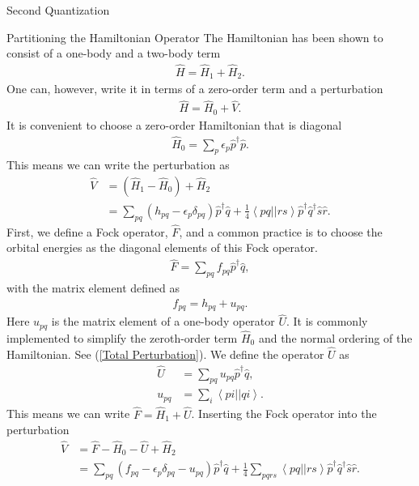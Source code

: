 \documentclass[twoside,english]{uiofysmaster}
\begin{document}
\begin{chapter}{Second Quantization}
	\begin{section}{Partitioning the Hamiltonian Operator}
		The Hamiltonian has been shown to consist of a one-body and a two-body term
		\begin{align}
			\hat H = \hat H_1 + \hat H_2.
		\end{align}
		One can, however, write it in terms of a zero-order term and a perturbation
		\begin{align}
			\hat H = \hat H_0 + \hat V.
		\end{align}
		It is convenient to choose a zero-order Hamiltonian that is diagonal
		\begin{align}
			\hat H_0 = \sum_p \epsilon_p \hat p^\dagger \hat p.
		\end{align}
		This means we can write the perturbation as
		\begin{align}
			\hat V &= (\hat H_1 - \hat H_0) + \hat H_2 \\
			&= \sum_{pq}(h_{pq} - \epsilon_p \delta_{pq} ) \hat p^\dagger \hat q + \frac{1}{4}\left<pq||rs\right>\hat p^\dagger \hat q^\dagger \hat s \hat r .
		\end{align}
		First, we define a Fock operator, $\hat F$, and a common practice is to choose the orbital energies as the diagonal elements of this Fock operator. 
		\begin{align}
			\hat F = \sum_{pq} f_{pq} \hat p^\dagger \hat q,
		\end{align}
		with the matrix element defined as
		\begin{align}
			f_{pq} = h_{pq} + u_{pq}.
		\end{align}
		Here $u_{pq}$ is the matrix element of a one-body operator $\hat U$. It is commonly implemented to simplify the zeroth-order term $\hat H_0$ and the normal ordering of the Hamiltonian. See (\ref{Total Perturbation}). We define the operator $\hat U$ as
		\begin{align}
			\hat U &= \sum_{pq} u_{pq} \hat p^\dagger \hat q, \\
			u_{pq} &= \sum_i \left<pi||qi\right>.
		\end{align}
		This means we can write $\hat F = \hat H_1 + \hat U$. Inserting the Fock operator into the perturbation
		\begin{align}
			\hat V &= \hat F - \hat H_0 - \hat U + \hat H_2 \\
				   &= \sum_{pq}(f_{pq} - \epsilon_p \delta_{pq} - u_{pq}) \hat p^\dagger \hat q + \frac{1}{4} \sum_{pqrs} \left<pq||rs\right> \hat p^\dagger \hat q^\dagger \hat s \hat r.
			\label{3.93}	

\end{align}
\end{section}
\end{chapter}
\end{document}
